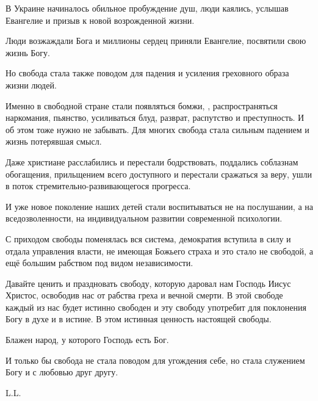 В Украине начиналось обильное пробуждение душ, люди каялись, услышав Евангелие
и призыв к новой возрожденной жизни.

Люди возжаждали Бога и миллионы сердец приняли Евангелие, посвятили свою жизнь
Богу.

Но свобода стала также поводом для  падения и усиления греховного образа жизни
людей.

Именно в свободной стране стали появляться бомжи, , распространяться
наркомания, пьянство, усиливаться  блуд, разврат, распутство и преступность. И
об этом тоже нужно не забывать. Для многих свобода стала сильным падением и
жизнь потерявшая смысл.

Даже христиане расслабились и перестали бодрствовать, поддались соблазнам
обогащения, прильщением всего доступного и перестали сражаться за веру, ушли в
поток стремительно-развивающегося прогресса.

И уже новое поколение наших детей стали воспитываться не на послушании, а на
вседозволенности, на индивидуальном развитии современной психологии.

С приходом свободы поменялась вся система, демократия вступила в силу и отдала
управления власти, не имеющая Божьего страха и это стало не свободой, а ещё
большим рабством под видом независимости.

Давайте ценить и праздновать свободу, которую даровал нам Господь Иисус
Христос, освободив нас от рабства греха и вечной смерти. В этой свободе каждый
из нас будет истинно свободен и эту свободу употребит для поклонения Богу в
духе и в истине. В этом истинная ценность  настоящей свободы.

Блажен народ, у которого Господь есть Бог.

И только бы свобода не стала поводом для угождения себе, но стала служением
Богу и с любовью друг другу.

L.L.

